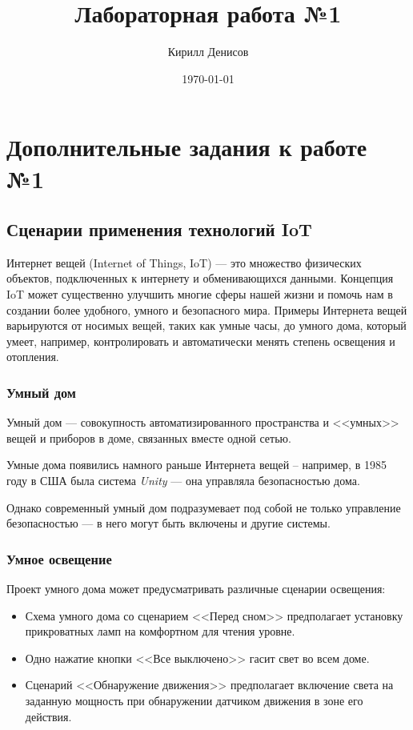 \documentclass[a4paper,14pt]{extarticle}
\author{Кирилл Денисов}
\title{Лабораторная работа №1}
\date{\today}
\newcommand{\pathToCommonFolder}{/home/denilai/Documents/repos/latex/Common}
\begin{document}
	\thispagestyle{empty}
	
	\newpage
	\tableofcontents
	\newpage
\section{Дополнительные задания к работе №1}
\subsection{Сценарии применения технологий IoT}
Интернет вещей (Internet of Things, IoT) --- это множество физических объектов, подключенных к интернету и обменивающихся данными. Концепция IoT может существенно улучшить многие сферы нашей жизни и помочь нам в создании более удобного, умного и безопасного мира. Примеры Интернета вещей варьируются от носимых вещей, таких как умные часы, до умного дома, который умеет, например, контролировать и автоматически менять степень освещения и отопления. 
\subsubsection*{Умный дом}

Умный дом --- совокупность автоматизированного пространства и <<умных>> вещей и приборов в доме, связанных вместе одной сетью.

Умные дома появились намного раньше Интернета вещей -- например, в 1985 году в США была система \textit{Unity} — она управляла безопасностью дома.

Однако современный умный дом подразумевает под собой не только управление безопасностью — в него могут быть включены и другие системы.
\subsubsection*{Умное освещение}
Проект умного дома может предусматривать различные сценарии освещения:
\begin{itemize}
\item Схема умного дома со сценарием <<Перед сном>> предполагает установку прикроватных ламп на комфортном для чтения уровне.
\item Одно нажатие кнопки <<Все выключено>> гасит свет во всем доме.
\item Сценарий <<Обнаружение движения>> предполагает включение света на заданную мощность при обнаружении датчиком движения в зоне его действия.
\end{itemize}
\end{document}

